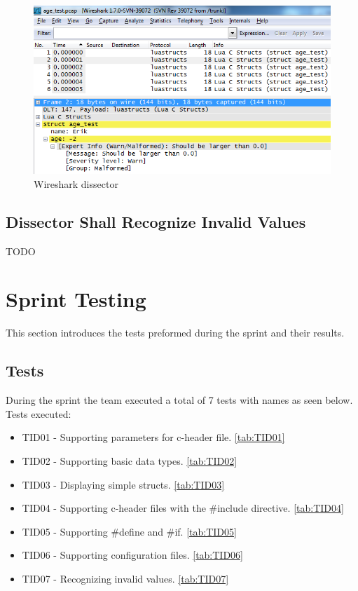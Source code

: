 \begin{figure}[htb]
	\center
	\includegraphics[width=\textwidth]{./sprints/img/wireshark_outofrange}
	\caption{Wireshark dissector\label{fig:sp1rangerule}}
\end{figure}





\subsection{Dissector Shall Recognize Invalid Values}
TODO

\section{Sprint Testing}
This section introduces the tests preformed during the sprint and their
results.

\subsection{Tests}
During the sprint the team executed a total of 7 tests with names as seen
below. Tests executed:
\begin{itemize}
	\item TID01 - Supporting parameters for c-header file. \autoref{tab:TID01}
	\item TID02 - Supporting basic data types. \autoref{tab:TID02}
	\item TID03 - Displaying simple structs. \autoref{tab:TID03}
	\item TID04 - Supporting c-header files with the \#include directive. \autoref{tab:TID04}
	\item TID05 - Supporting \#define and \#if. \autoref{tab:TID05}
	\item TID06 - Supporting configuration files. \autoref{tab:TID06}
	\item TID07 - Recognizing invalid values. \autoref{tab:TID07}
\end{itemize}

